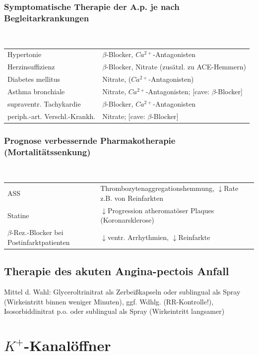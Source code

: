 \documentclass[10pt,a4paper]{report}
\begin{document}
\subsubsection{Symptomatische Therapie der A.p. je nach Begleitarkrankungen} \mbox{} \\

\begin{tabularx}{\textwidth}{XX}
Hypertonie&$\beta$-Blocker, $Ca^{2+}$-Antagonisten\\
Herzinsuffizienz&$\beta$-Blocker, Nitrate (zusätzl. zu ACE-Hemmern)\\
Diabetes mellitus&Nitrate, ($Ca^{2+}$-Antagonisten)\\
Asthma bronchiale&Nitrate, $Ca^{2+}$-Antagonisten; [cave: $\beta$-Blocker]\\
supraventr. Tachykardie&$\beta$-Blocker, $Ca^{2+}$-Antagonisten\\
periph.-art. Verschl.-Krankh.&Nitrate; [cave: $\beta$-Blocker]\\
\end{tabularx}

\subsubsection{Prognose verbessernde Pharmakotherapie (Mortalitätssenkung)} \mbox{} \\


\begin{tabularx}{\textwidth}{XX}
ASS&Thrombozytenaggregationshemmung,  $\downarrow$Rate z.B. von Reinfarkten \\
Statine&$\downarrow$Progression atheromatöser Plaques (Koronarsklerose)\\
$\beta$-Rez.-Blocker bei Postinfarktpatienten& $\downarrow$ventr. Arrhythmien, $\downarrow$Reinfarkte\\ 
\end{tabularx}

\subsection{Therapie des akuten Angina-pectois Anfall}

Mittel d. Wahl: Glyceroltrinitrat als Zerbeißkapseln oder sublingual als Spray (Wirkeintritt binnen weniger Minuten), ggf. Wdhlg. (RR-Kontrolle!), Isosorbiddinitrat p.o. oder sublingual als Spray (Wirkeintritt langsamer)

\section{$K^+$-Kanalöffner}
\end{document}
